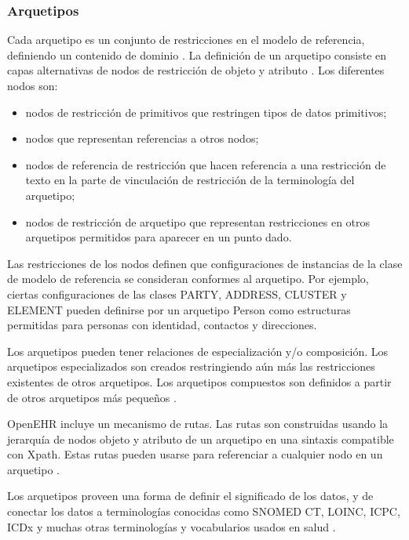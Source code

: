 \subsubsection{Arquetipos}

Cada arquetipo es un conjunto de restricciones en el modelo de referencia, definiendo un contenido de dominio \cite{openEHRArchitecture}. La definición de un arquetipo consiste en capas alternativas de nodos de restricción de objeto y atributo \cite{openEHRAOM}. Los diferentes nodos son:
\begin{itemize}
  \item nodos de restricción de primitivos que restringen tipos de datos primitivos;
  \item nodos que representan referencias a otros nodos;
  \item nodos de referencia de restricción que hacen referencia a una restricción de texto en la parte de vinculación de restricción de la terminología del arquetipo;
  \item nodos de restricción de arquetipo que representan restricciones en otros arquetipos permitidos para aparecer en un punto dado.
\end{itemize}

Las restricciones de los nodos definen que configuraciones de instancias de la clase de modelo de referencia se consideran conformes al arquetipo. Por ejemplo, ciertas configuraciones de las clases PARTY, ADDRESS, CLUSTER y ELEMENT pueden definirse por un arquetipo Person como estructuras permitidas para personas con identidad, contactos y direcciones.

Los arquetipos pueden tener relaciones de especialización y/o composición. Los arquetipos especializados son creados restringiendo aún más las restricciones existentes de otros arquetipos. Los arquetipos compuestos son definidos a partir de otros arquetipos más pequeños \cite{openEHRArchitecture}.

OpenEHR incluye un mecanismo de rutas. Las rutas son construidas usando la jerarquía de nodos objeto y atributo de un arquetipo en una sintaxis compatible con Xpath. Estas rutas pueden usarse para referenciar a cualquier nodo en un arquetipo \cite{openEHRArchitecture}.

Los arquetipos proveen una forma de definir el significado de los datos, y de conectar los datos a terminologías conocidas como SNOMED CT, LOINC, ICPC, ICDx y muchas otras terminologías y vocabularios usados en salud \cite{openEHRArchitecture}.
